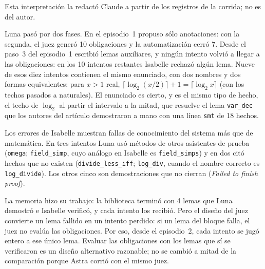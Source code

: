 Esta interpretación la redactó Claude a partir de los registros de la corrida; no es del autor.

Luna pasó por dos fases. En el episodio~1 propuso sólo anotaciones: con la segunda, el juez generó 10 obligaciones y la automatización cerró 7. Desde el paso~3 del episodio~1 escribió lemas auxiliares, y ningún intento volvió a llegar a las obligaciones: en los 10 intentos restantes Isabelle rechazó algún lema. Nueve de esos diez intentos contienen el mismo enunciado, con dos nombres y dos formas equivalentes: para $x > 1$ real, $\lceil \log_2 (x/2) \rceil + 1 = \lceil \log_2 x \rceil$ (con los techos pasados a naturales). El enunciado es cierto, y es el mismo tipo de hecho, el techo de $\log_2$ al partir el intervalo a la mitad, que resuelve el lema \texttt{var\_dec} que los autores del artículo demostraron a mano con una línea \texttt{smt} de 18 hechos.

Los errores de Isabelle muestran fallas de conocimiento del sistema más que de matemática. En tres intentos Luna usó métodos de otros asistentes de prueba (\texttt{omega}; \texttt{field\_simp}, cuyo análogo en Isabelle es \texttt{field\_simps}) y en dos citó hechos que no existen (\texttt{divide\_less\_iff}; \texttt{log\_div}, cuando el nombre correcto es \texttt{log\_divide}). Los otros cinco son demostraciones que no cierran (\emph{Failed to finish proof}).

La memoria hizo su trabajo: la biblioteca terminó con 4 lemas que Luna demostró e Isabelle verificó, y cada intento los recibió. Pero el diseño del juez convierte un lema fallido en un intento perdido: si un lema del bloque falla, el juez no evalúa las obligaciones. Por eso, desde el episodio~2, cada intento se jugó entero a ese único lema. Evaluar las obligaciones con los lemas que sí se verificaron es un diseño alternativo razonable; no se cambió a mitad de la comparación porque Astra corrió con el mismo juez.
